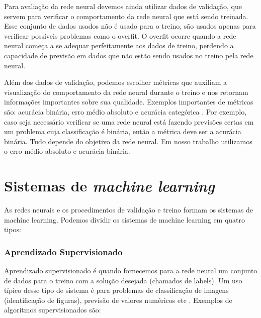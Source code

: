 \documentclass[a4paper,12pt,oneside]{book}
\begin{document}
\par Para avaliação da rede neural devemos ainda utilizar dados de validação, que servem para verificar o comportamento da rede neural que está sendo treinada. Esse conjunto de dados usados não é usado para o treino, são usados apenas para verificar possíveis problemas como o overfit. O overfit ocorre quando a rede neural começa a se adequar perfeitamente aos dados de treino, perdendo a capacidade de previsão em dados que não estão sendo usados no treino pela rede neural.

\par Além dos dados de validação, podemos escolher métricas que auxiliam a visualização do comportamento da rede neural durante o treino e nos retornam informações importantes sobre sua qualidade. Exemplos importantes de métricas são: acurácia binária, erro médio absoluto e acurácia categórica \cite{metrics}. Por exemplo, caso seja necessário verificar se uma rede neural está fazendo previsões certas em um problema cuja classificação é binária, então a métrica deve ser a acurácia binária. Tudo depende do objetivo da rede neural. Em nosso trabalho utilizamos o erro médio absoluto e acurácia binária.

\section{Sistemas de \textit{machine learning}}

\par As redes neurais e os procedimentos de validação e treino formam os sistemas de machine learning. Podemos dividir os sistemas de machine learning em quatro tipos:

\subsubsection*{Aprendizado Supervisionado}

\par Aprendizado supervisionado é quando fornecemos para a rede neural um conjunto de dados para o treino com a solução desejada (chamados de labels). Um uso típico desse tipo de sistema é para problemas de classificação de imagens (identificação de figuras), previsão de valores numéricos etc \cite{mlbook}. Exemplos de algoritmos supervisionados são:
\end{document}
